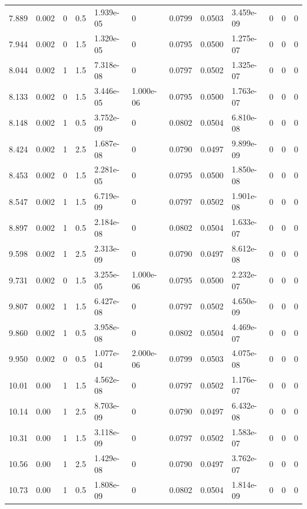 \documentclass[preview]{standalone}
\begin{document}
{{{\begin{tabular}{L{1.2cm}C{1.2cm} C{0.3cm}C{0.5cm} C{1.4cm}C{1.4cm} C{1.4cm}C{1.4cm} C{1.6cm}C{1.6cm} C{1.6cm}C{1.6cm}}
  7.889  &  0.002  & 0     & 0.5 &  1.939e-05  & 0  &  0.0799&   0.0503& 3.459e-09 & 0   &  0 & 0  \\ 
  7.944  &  0.002  & 0     & 1.5 &  1.320e-05  & 0  &  0.0795&   0.0500& 1.275e-07 & 0   &  0 & 0  \\ 
  8.044  &  0.002  & 1     & 1.5 &  7.318e-08  & 0  &  0.0797&   0.0502& 1.325e-07 & 0   &  0 & 0  \\ 
  8.133  &  0.002  & 0     & 1.5 &  3.446e-05  & 1.000e-06  &  0.0795&   0.0500& 1.763e-07 & 0   &  0 & 0  \\ 
  8.148  &  0.002  & 1     & 0.5 &  3.752e-09  & 0  &  0.0802&   0.0504& 6.810e-08 & 0   &  0 & 0  \\ 
  8.424  &  0.002  & 1     & 2.5 &  1.687e-08  & 0  &  0.0790&   0.0497& 9.899e-09 & 0   &  0 & 0  \\ 
  8.453  &  0.002  & 0     & 1.5 &  2.281e-05  & 0  &  0.0795&   0.0500& 1.850e-08 & 0   &  0 & 0  \\ 
  8.547  &  0.002  & 1     & 1.5 &  6.719e-09  & 0  &  0.0797&   0.0502& 1.901e-08 & 0   &  0 & 0  \\ 
  8.897  &  0.002  & 1     & 0.5 &  2.184e-08  & 0  &  0.0802&   0.0504& 1.633e-07 & 0   &  0 & 0  \\ 
  9.598  &  0.002  & 1     & 2.5 &  2.313e-09  & 0  &  0.0790&   0.0497& 8.612e-08 & 0   &  0 & 0  \\ 
  9.731  &  0.002  & 0     & 1.5 &  3.255e-05  & 1.000e-06  &  0.0795&   0.0500& 2.232e-07 & 0   &  0 & 0  \\ 
  9.807  &  0.002  & 1     & 1.5 &  6.427e-08  & 0  &  0.0797&   0.0502& 4.650e-09 & 0   &  0 & 0  \\ 
  9.860  &  0.002  & 1     & 0.5 &  3.958e-08  & 0  &  0.0802&   0.0504& 4.469e-07 & 0   &  0 & 0  \\ 
  9.950  &  0.002  & 0     & 0.5 &  1.077e-04  & 2.000e-06  &  0.0799&   0.0503& 4.075e-08 & 0   &  0 & 0  \\ 
  10.01  &  0.00  & 1     & 1.5 &  4.562e-08  & 0  &  0.0797&   0.0502& 1.176e-07 & 0   &  0 & 0  \\ 
  10.14  &  0.00  & 1     & 2.5 &  8.703e-09  & 0  &  0.0790&   0.0497& 6.432e-08 & 0   &  0 & 0  \\ 
  10.31  &  0.00  & 1     & 1.5 &  3.118e-09  & 0  &  0.0797&   0.0502& 1.583e-07 & 0   &  0 & 0  \\ 
  10.56  &  0.00  & 1     & 2.5 &  1.429e-08  & 0  &  0.0790&   0.0497& 3.762e-07 & 0   &  0 & 0  \\ 
  10.73  &  0.00  & 1     & 0.5 &  1.808e-09  & 0  &  0.0802&   0.0504& 1.814e-09 & 0   &  0 & 0  \\ 

\end{tabular}}}}
\end{document}
